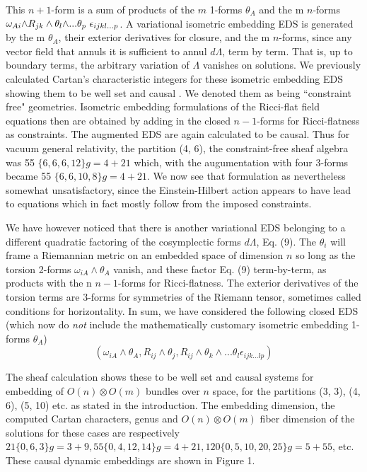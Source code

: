 \documentclass[a4paper,a4paper]{article}
\begin{document}
This $n+1$-form is a sum of products of the $m$ 1-forms ${{\theta
}_A}$ and the m $n$-forms ${{\omega }_{{Ai}}}\wedge \)\(
{R_{{jk}}}\wedge {{\theta }_l}\wedge \)...\({{\theta }_p}\) \({{\epsilon
}_{{ijkl}...p}}$.  A variational isometric embedding EDS is generated
by  the m  ${{\theta }_A}$,  their exterior derivatives for closure,  and the m
$n$-forms,  since any vector field that annuls it is sufficient to annul
${d\Lambda}$,  term by term.  That is,  up to boundary terms,  the arbitrary
variation of \(\Lambda \) vanishes on solutions.  We previously
calculated  Cartan's characteristic integers for these isometric embedding EDS  showing them
to be well set and causal \cite{est99}.  We denoted them as being
``constraint free" geometries.  Isometric embedding  formulations of the Ricci-flat field
equations then are obtained by adding in the closed $n-1$-forms for
Ricci-flatness as constraints. The augmented  EDS are again calculated to be causal.
Thus for vacuum general relativity,  the partition (4, 6),  the
constraint-free sheaf algebra was 55 $\{6, 6, 6, 12\} g = 4 + 21$ which,  with the
augumentation with four 3-forms became 55 $\{6, 6, 10, 8\} g  =  4  +
21$.  We now see that formulation as nevertheless somewhat unsatisfactory,  since
the Einstein-Hilbert action appears to have lead to equations which in
fact mostly follow from the imposed constraints.

        We have however noticed that there is another variational EDS
belonging to a different quadratic factoring of the cosymplectic forms
${d\Lambda }$,  Eq. (9).  The ${{\theta }_{i }}$ will frame a Riemannian metric on
an embedded space of dimension $n$ so long as the torsion 2-forms
${{\omega }_{{iA}}}\wedge {{\theta }_A}$ vanish,  and these factor Eq.
(9) term-by-term,  as products with the n $n-1$-forms for
Ricci-flatness. The exterior derivatives of the torsion terms are 3-forms for
symmetries of the Riemann tensor,  sometimes called conditions for
horizontality. In sum,  we have considered the following closed EDS (which now do
{\itshape not} include the mathematically customary isometric embedding
1-forms ${{\theta }_A}$)
\begin{equation}
({{\omega }_{{iA}}}\wedge {{\theta }_A},  {R_{{ij}}}\wedge {{\theta
}_j}, {R_{{ij}}}\wedge
{{\theta }_k}\wedge ...{{\theta }_l}{{\epsilon }_{{ijk}...{lp}}})
\end{equation}

The sheaf calculation shows these to be  well set and causal systems for
embedding of $O(n) \otimes O(m)$ bundles over $n$ space,  for the
partitions (3, 3),  (4, 6),  (5, 10) etc. as stated in the introduction.  The
embedding dimension,  the computed Cartan characters,  genus and
$O(n) \otimes O(m)$ fiber dimension of the solutions for these cases are 
respectively $21\{0, 6, 3\} g = 3 + 9,  55\{0, 4, 12, 14\} g = 4  +
21,   120\{0, 5, 10, 20, 25\} g = 5 + 55$,  etc.  These causal dynamic 
embeddings are shown in Figure 1.
\end{document}
